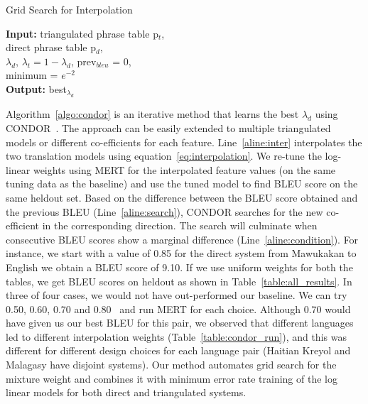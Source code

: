 \documentclass[11pt]{article}
\begin{document}
	\begin{algorithm}
		\small
		\caption{Grid Search for Interpolation}
		\label{algo:condor}
		\textbf{Input:} triangulated phrase table p$_{t}$, \\ direct phrase table p$_{d}$, \\
		$\lambda_{d}$, $\lambda_{t} = 1 - \lambda_{d}$, prev$_{bleu}$ = 0, \\
		minimum = $e ^{-2}$ \\
		\textbf{Output:} best$_{\lambda_{d}}$


		\begin{algorithmic}[1]
			 \label{aline:condition}
			 \label{aline:inter}
			 \label{aline:search}
			\ENDWHILE
		\end{algorithmic}
	\end{algorithm}

	Algorithm~\ref{algo:condor} is an iterative method that learns the best $\lambda_{d}$  using CONDOR~\cite{Condor:05}. The approach can be easily extended to multiple triangulated models or different co-efficients for each feature. Line~\ref{aline:inter} interpolates the two translation models using equation~\eqref{eq:interpolation}. We re-tune the log-linear weights using MERT for the interpolated feature values (on the same tuning data as the baseline) and use the tuned model to find BLEU score on the same heldout set. Based on the difference between the BLEU score obtained and the previous BLEU (Line~\ref{aline:search}), CONDOR searches for the new co-efficient in the corresponding direction. The search will culminate when consecutive BLEU scores show a marginal difference (Line~\ref{aline:condition}). For instance, we start with a value of 0.85 for the direct system from Mawukakan to English we obtain a BLEU score of 9.10.  If we use uniform weights for both the tables, we get BLEU scores on heldout as shown in Table~\ref{table:all_results}. In three of four cases, we would not have out-performed our baseline. We can try 0.50, 0.60, 0.70 and 0.80~\cite{Nakov:12} and run MERT for each choice. Although 0.70 would have given us our best BLEU for this pair, we observed that different languages led to different interpolation weights (Table~\ref{table:condor_run}), and this was different for different design choices for each language pair (Haitian Kreyol and Malagasy have disjoint systems). Our method automates grid search for the mixture weight and combines it with minimum error rate training of the log linear models for both direct and triangulated systems.
\end{document}
